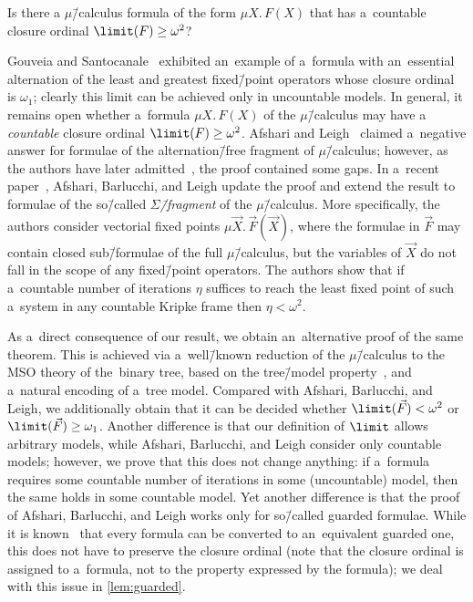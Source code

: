 \begin{qu}\label{con:czarnecki}
	Is there a $\mu$\=/calculus formula of the form $\mu X.\,F(X)$ that has a~countable closure ordinal $\limit(F)\geq\omega^2$?
\end{qu}

Gouveia and Santocanale~\cite{santocanale-closure} exhibited an~example of a~formula with an~essential alternation of the least and greatest fixed\=/point operators whose closure ordinal is $\omega_1$; clearly this limit can be achieved only in uncountable models.
In general, it remains open whether a~formula $\mu X.\,F(X)$ of the $\mu$\=/calculus may have a \emph{countable} closure ordinal $\limit(F) \geq \omega^2$.
Afshari and Leigh~\cite{afshari_closure} claimed a~negative answer for formulae of the alternation\=/free fragment of $\mu$\=/calculus;
however, as the authors have later admitted~\cite{afshari_limit_fics}, the proof contained some gaps.
In a~recent paper~\cite{afshari_limit_fics}, Afshari, Barlucchi, and Leigh update the proof and extend the result to formulae of the so\=/called \emph{$\Sigma$\=/fragment} of the $\mu$\=/calculus.
More specifically, the authors consider vectorial fixed points $\mu \vec{X}.\,\vec{F}(\vec{X})$,
where the formulae in $\vec{F}$ may contain closed sub\=/formulae of the full $\mu$\=/calculus, but the variables of $\vec{X}$ do not fall in the scope of any fixed\=/point operators.
The authors show that if a~countable number of iterations $\eta$ suffices to reach the least fixed point of such a~system in any countable Kripke frame then $\eta < \omega^2$.

As a~direct consequence of our result, we obtain an~alternative proof of the same theorem.
This is achieved via a~well\=/known reduction of the $\mu$\=/calculus to the MSO theory of the~binary tree,
based on the tree\=/model property~\cite{julian-igor-handook}, and a~natural encoding of a~tree model.
Compared with Afshari, Barlucchi, and Leigh, we additionally obtain that it can be decided whether $\limit(\vec{F}) < \omega^2$ or $\limit(\vec{F})\geq\omega_1$.
Another difference is that our definition of $\limit$ allows arbitrary models, while Afshari, Barlucchi, and Leigh consider only countable models;
however, we prove that this does not change anything: if a~formula requires some countable number of iterations in some (uncountable) model, then the same holds in some countable model.
Yet another difference is that the proof of Afshari, Barlucchi, and Leigh works only for so\=/called guarded formulae.
While it is known~\cite{kozen-mu-calc} that every formula can be converted to an~equivalent guarded one, this does not have to preserve the closure ordinal
(note that the closure ordinal is assigned to a~formula, not to the property expressed by the formula); we deal with this issue in \cref{lem:guarded}.

